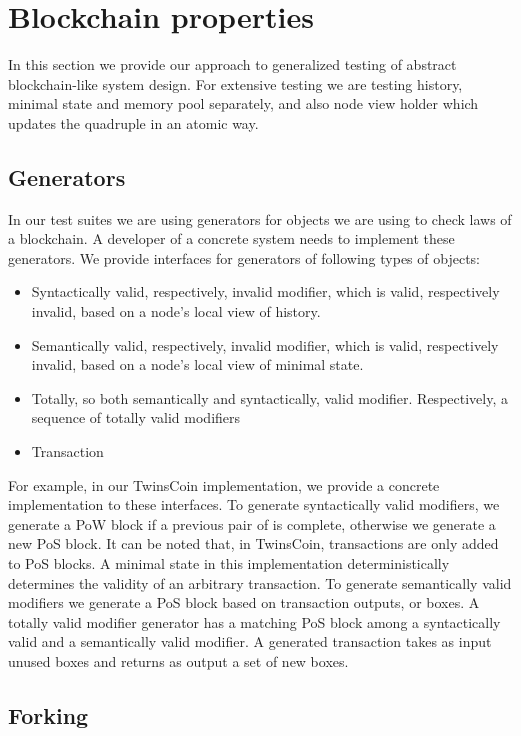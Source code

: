 
\section{Blockchain properties}

In this section we provide our approach to generalized testing of abstract blockchain-like system design. For extensive testing we are  testing history, minimal state and memory pool separately, and also node view holder which updates the quadruple {\em <history, minimal state, vault, memory pool>} in an atomic way.


\subsection{Generators}

In our test suites we are using generators for objects we are using to check laws of a blockchain. A developer of a concrete system needs to implement these generators. We provide interfaces for generators of following types of objects:

\begin{itemize}
	\item{Syntactically valid, respectively, invalid modifier, which is valid, respectively invalid, based on a node's local view of history.}
	\item{Semantically valid, respectively, invalid modifier, which is valid, respectively invalid, based on a node's local view of minimal state.}
	\item{Totally, so both semantically and syntactically, valid modifier. Respectively, a sequence of totally valid modifiers}
	\item{Transaction}
\end{itemize}

For example, in our TwinsCoin implementation, we provide a concrete implementation to these interfaces. To generate syntactically valid modifiers, we generate a PoW block if a previous pair of {\em<PoW block, PoS block>} is complete, otherwise we generate a new PoS block. It can be noted that, in TwinsCoin, transactions are only added to PoS blocks. A minimal state in this implementation deterministically determines the validity of an arbitrary transaction. To generate semantically valid modifiers we generate a PoS block based on transaction outputs, or boxes. A totally valid modifier generator has a matching PoS block among a syntactically valid and a semantically valid modifier. A generated transaction takes as input unused boxes and returns as output a set of new boxes.

\subsection{Forking}


